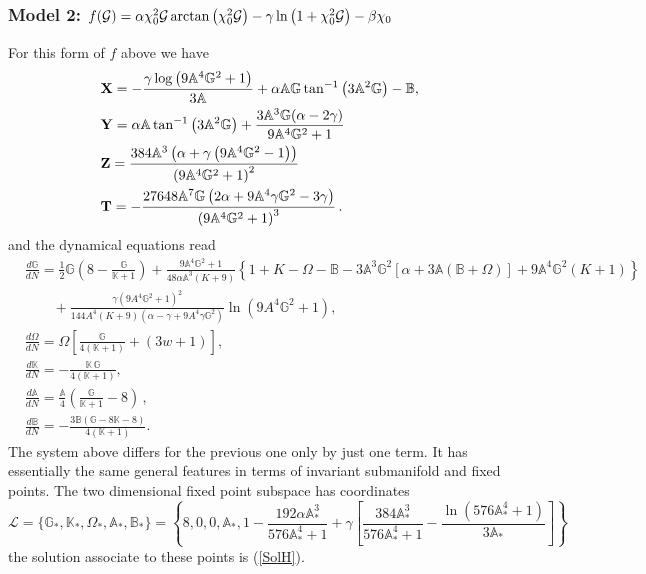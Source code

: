 \documentclass[a4paper,aps,onecolumn,nofootinbib]{revtex4}
\def\rf#1{(\ref{#1})}
\newcommand{\A}{\mathbb{A}}
\def\DerN#1{\frac{d #1}{d N}}
\def\G{{\cal G}}
\begin{document}
\subsubsection{Model 2: $f(\G)= \alpha \chi_0^2 \G \arctan\left(\chi_0^2 \G\right)-\gamma \ln\left(1+\chi_0^2 \G\right)  -\beta \chi_0$}
For this form of $f$ above we have 
 \begin{align} \label{XYT}
& {\bf X}=-\frac{\gamma  \log \left(9 \mathbb{A}^4
   \mathbb{G}^2+1\right)}{3 \mathbb{A}}+\alpha  \mathbb{A} \mathbb{G} \tan ^{-1}\left(3
   \mathbb{A}^2 \mathbb{G}\right)- \mathbb{B},\\
&  {\bf Y}=\alpha 
   \mathbb{A} \tan ^{-1}\left(3 \mathbb{A}^2 \mathbb{G}\right)+\frac{3 \mathbb{A}^3
   \mathbb{G} (\alpha -2 \gamma )}{9 \mathbb{A}^4 \mathbb{G}^2+1}\\
& {\bf Z}=\frac{384 \mathbb{A}^3 \left(\alpha +\gamma  \left(9 \mathbb{A}^4
   \mathbb{G}^2-1\right)\right)}{\left(9 \mathbb{A}^4
   \mathbb{G}^2+1\right)^2}\\
&  {\bf T}= -\frac{27648 \mathbb{A}^7 \mathbb{G}
   \left(2 \alpha +9 \mathbb{A}^4 \gamma  \mathbb{G}^2-3 \gamma \right)}{\left(9
   \mathbb{A}^4 \mathbb{G}^2+1\right)^3}\,.
\end{align}
and the dynamical equations read
\begin{equation}\label{DynSysEx2b}
\begin{split}
&\DerN{\mathbb{G}}= \frac{1}{2} \mathbb{G}
   \left(8-\frac{\mathbb{G}}{\mathbb{K}+1}\right)+\frac{9 \mathbb{A}^4 \mathbb{G}^2+1}{48 \alpha  \mathbb{A}^3 (K+9)}\left\{1+K-\Omega -\mathbb{B}-3 \mathbb{A}^3 \mathbb{G}^2 \left[\alpha +3 \mathbb{A} (\mathbb{B}+\Omega )\right]+9
   \mathbb{A}^4 \mathbb{G}^2 (K+1)\right\}\\
   &~~~~~~~~~+\frac{\gamma  \left(9 A^4 \mathbb{G}^2+1\right)^2 }{144 A^4 (K+9) \left(\alpha-\gamma +9 A^4 \gamma  \mathbb{G}^2
   \right)}\ln \left(9 A^4
   \mathbb{G}^2+1\right),\\ 
&\DerN{\Omega} =\Omega  \left[\frac{\mathbb{G}}{4 (\mathbb{K}+1)}+(3 w+1)\right],\\ 
&\DerN{\mathbb{K} }=-\frac{\mathbb{K}\, \mathbb{G} }{4(
   \mathbb{K}+1)},\\
&\DerN{\mathbb{A}}=\frac{\mathbb{A}}{4}  \left(\frac{\mathbb{G}}{\mathbb{K}+1}-8\right)\,,\\
&\DerN{\mathbb{B}}=-\frac{3 \mathbb{B} (\mathbb{G}-8 \mathbb{K}-8)}{4
   (\mathbb{K}+1)}.
\end{split}
\end{equation}
The system above differs for the previous one only by just one term. It has essentially the same general features in terms of invariant submanifold and fixed points.  The two dimensional fixed point subspace has coordinates
\begin{equation}
\mathcal{L}=\{\mathbb{G}_*,\mathbb{K}_*,\Omega_*, \A_*, \mathbb{B}_*\}=\left\{8,0,0, \A_*, 1-\frac{192 \alpha  \mathbb{A}_*^3}{576 \mathbb{A}_*^4+1}+\gamma  \left[\frac{384
   \mathbb{A}_*^3}{576 \mathbb{A}_*^4+1}-\frac{\ln \left(576 \mathbb{A}_*^4+1\right)}{3
   \mathbb{A}_*}\right]\right\}
\end{equation}
the solution associate to these points is \rf{SolH}.
\end{document}
